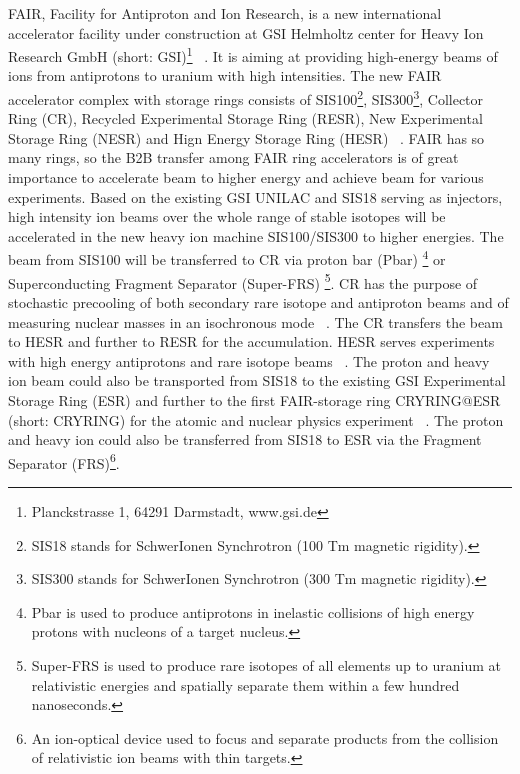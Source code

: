 \gls{FAIR}, Facility for Antiproton and Ion Research, is a new international accelerator facility under construction at \gls{GSI} Helmholtz center for Heavy Ion Research GmbH (short: GSI)\footnote{Planckstrasse 1, 64291 Darmstadt, www.gsi.de} ~\cite{eschke_international_2005, _fair_2011}. It is aiming at providing high-energy beams of ions from antiprotons to uranium with high intensities. The new FAIR accelerator complex with storage rings consists of \gls{SIS100}\footnote{SIS18 stands for SchwerIonen Synchrotron (100 Tm magnetic rigidity).}, SIS300\footnote{SIS300 stands for SchwerIonen Synchrotron (300 Tm magnetic rigidity).}, Collector Ring (\gls{CR}), Recycled Experimental Storage Ring (\gls{RESR}), New Experimental Storage Ring (\gls{NESR}) and Hign Energy Storage Ring (\gls{HESR}) ~\cite{spiller_fair_2006, steck_advanced_2008}. FAIR has so many rings, so the B2B transfer among FAIR ring accelerators is of great importance to accelerate beam to higher energy and achieve beam for various experiments. Based on the existing GSI \gls{UNILAC} and \gls{SIS18} serving as injectors, high intensity ion beams over the whole range of stable isotopes will be accelerated in the new heavy ion machine SIS100/\gls{SIS300} to higher energies. The beam from SIS100 will be transferred to CR via proton bar (\gls{Pbar}) \footnote{Pbar is used to produce antiprotons in inelastic collisions of high energy protons with nucleons of a target nucleus.} or Superconducting Fragment Separator (Super-FRS) \footnote{Super-FRS is used to produce rare isotopes of all elements up to uranium at relativistic energies and spatially separate them within a few hundred nanoseconds.}. CR has the purpose of stochastic precooling of both secondary rare isotope and antiproton beams and of measuring nuclear masses in an isochronous mode ~\cite{nolden_collector_2006, abe_technical_2010}. The CR transfers the beam to HESR and further to RESR for the accumulation. HESR serves experiments with high energy antiprotons and rare isotope beams ~\cite{toelle_hesr_2007}. The proton and heavy ion beam could also be transported from SIS18 to the existing GSI Experimental Storage Ring (\gls{ESR}) and further to the first FAIR-storage ring CRYRING@ESR (short: CRYRING) for the atomic and nuclear physics experiment ~\cite{lestinsky_cryring_2015, lestinsky_cryring_2012}. The proton and heavy ion could also be transferred from SIS18 to ESR via the Fragment Separator (\gls{FRS})\footnote{An ion-optical device used to focus and separate products from the collision of relativistic ion beams with thin targets.}.


